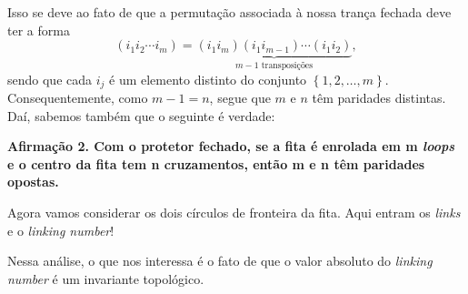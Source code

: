 	\par\vspace{0.3cm} Isso se deve ao fato de que a permutação associada à nossa trança fechada deve ter a forma
	\begin{equation*}
	    (i_1i_2\cdots i_m) = \underbrace{(i_1i_m)(i_1i_{m-1})\cdots(i_1i_2)}_{m-1\text{ transposições}},
	\end{equation*}
	sendo que cada $i_j$ é um elemento distinto do conjunto $\left\{1, 2, \dots, m \right\}$.
	Consequentemente, como $m-1=n$, segue que $m$ e $n$ têm paridades distintas. Daí, sabemos também que o 
	seguinte é verdade:
	\begin{center}
		\textbf{Afirmação 2. Com o protetor fechado, se a fita é enrolada em m \textit{loops} e o centro 
		da fita tem n cruzamentos, então m e n têm paridades opostas.}
	\end{center}
	Agora vamos considerar os dois círculos de fronteira da fita. Aqui entram os 
	\textit{links} e o \textit{linking number}!
	
	\par\vspace{0.3cm} Nessa análise, o que nos interessa é o fato de que o valor absoluto do 
	\textit{linking number} é um invariante topológico.
	
